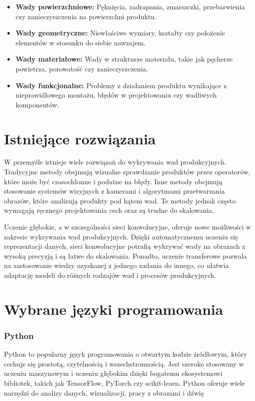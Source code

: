 \begin{itemize}
\item \textbf{Wady powierzchniowe:} Pęknięcia, zadrapania, zmarszczki, przebarwienia czy zanieczyszczenia na powierzchni produktu.
\item \textbf{Wady geometryczne:} Niewłaściwe wymiary, kształty czy położenie elementów w stosunku do siebie nawzajem.
\item \textbf{Wady materiałowe:} Wady w strukturze materiału, takie jak pęcherze powietrza, porowatość czy zanieczyszczenia.
\item \textbf{Wady funkcjonalne:} Problemy z działaniem produktu wynikające z nieprawidłowego montażu, błędów w projektowaniu czy wadliwych komponentów.
\end{itemize}

\section{Istniejące rozwiązania}
W przemyśle istnieje wiele rozwiązań do wykrywania wad produkcyjnych. Tradycyjne metody obejmują wizualne sprawdzanie produktów przez operatorów, które może być czasochłonne i podatne na błędy. Inne metody obejmują stosowanie systemów wizyjnych z kamerami i algorytmami przetwarzania obrazów, które analizują produkty pod kątem wad. Te metody jednak często wymagają ręcznego projektowania cech oraz są trudne do skalowania.

Uczenie głębokie, a w szczególności sieci konwolucyjne, oferuje nowe możliwości w zakresie wykrywania wad produkcyjnych. Dzięki automatycznemu uczeniu się reprezentacji danych, sieci konwolucyjne potrafią wykrywać wady na obrazach z wysoką precyzją i są łatwe do skalowania. Ponadto, uczenie transferowe pozwala na zastosowanie wiedzy uzyskanej z jednego zadania do innego, co ułatwia adaptację modeli do różnych rodzajów wad i procesów produkcyjnych.

\section{Wybrane języki programowania}
\subsubsection{Python}
Python to popularny język programowania o otwartym kodzie źródłowym, który cechuje się prostotą, czytelnością i wszechstronnością. Jest szeroko stosowany w uczeniu maszynowym i uczeniu głębokim dzięki bogatemu ekosystemowi bibliotek, takich jak TensorFlow, PyTorch czy scikit-learn. Python oferuje wiele narzędzi do analizy danych, wizualizacji, pracy z obrazami i dźwię
